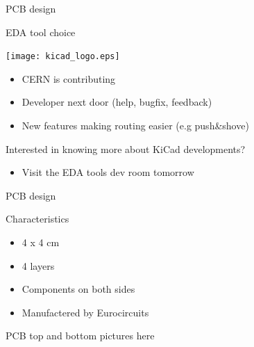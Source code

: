 \documentclass[compress,red]{beamer}
\begin{document}
\begin{frame}{PCB design}

  EDA tool choice

  \begin{center}
    \texttt{[image: kicad\_logo.eps]}
  \end{center}

  \begin{itemize}
  \item CERN is contributing
  \item Developer next door (help, bugfix, feedback)
  \item New features making routing easier (e.g push\&shove)
  \end{itemize}

  Interested in knowing more about KiCad developments?
  \begin{itemize}
  \item Visit the EDA tools dev room tomorrow
  \end{itemize}

  \note[item]{}

\end{frame}

\begin{frame}{PCB design}

  Characteristics

  \begin{itemize}
  \item 4 x 4 cm
  \item 4 layers
  \item Components on both sides
  \item Manufactered by Eurocircuits
  \end{itemize}

  \begin{center}
    PCB top and bottom pictures here
  \end{center}


\end{frame}
\end{document}
